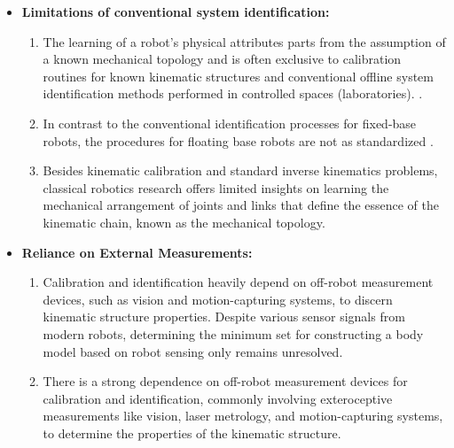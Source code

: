\documentclass[12pt, a4paper]{article}
\begin{document}
\begin{itemize}
    \item \textbf{Limitations of conventional system identification:} 
	\begin{enumerate}
		\item The learning of a robot's physical attributes parts from the assumption of a known mechanical topology and is often exclusive to calibration routines for known kinematic structures \cite{Hollerbach1996CalibrationIndexTaxonomy} and conventional offline system identification methods performed in controlled spaces (laboratories). \cite{Swevers2007Dynamicmodelidentification,LeboutetInertialParameterIdentification}.
		\item In contrast to the conventional identification processes for fixed-base robots, the procedures for floating base robots are not as standardized \cite{Ayusawa2014Identifiabilityidentificationinertial,Lee2022OptimizedSystemIdentification}.    	
		\item Besides kinematic calibration and standard inverse kinematics problems, classical robotics research offers limited insights on learning the mechanical arrangement of joints and links that define the essence of the kinematic chain, known as the mechanical topology.
	\end{enumerate}
		
	\item \textbf{Reliance on External Measurements:}
	\begin{enumerate}
		\item  Calibration and identification heavily depend on off-robot measurement devices, such as vision and motion-capturing systems, to discern kinematic structure properties. Despite various sensor signals from modern robots, determining the minimum set for constructing a body model based on robot sensing only remains unresolved.	
		\item There is a strong dependence on off-robot measurement devices for calibration and identification, commonly involving exteroceptive measurements like vision, laser metrology, and motion-capturing systems, to determine the properties of the kinematic structure.	
	\end{enumerate}	
		

\end{itemize}
\end{document}
